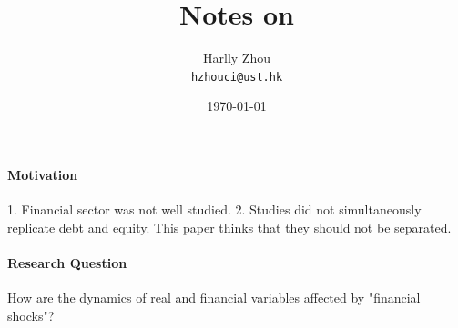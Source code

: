 \documentclass[12pt]{article}
\title{Notes on \cite{jermannMacroeconomicEffectsFinancial2012}}
\author{Harlly Zhou \\ \texttt{hzhouci@ust.hk}}
\date{\today}
\numberwithin{equation}{section}
\begin{document}
\maketitle

\paragraph{Motivation} 1. Financial sector was not well studied. 2. Studies did not simultaneously replicate debt and equity. This paper thinks that they should not be separated. 

\paragraph{Research Question} How are the dynamics of real and financial variables affected by "financial shocks"?
\end{document}
